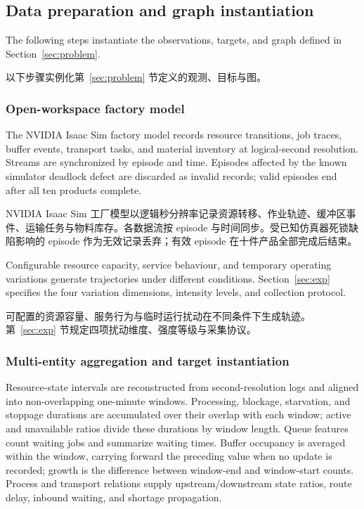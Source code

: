 \documentclass[a4paper,fleqn]{cas-dc}
\newcommand{\zhpara}[1]{%
  \par\begingroup\small\color{black!72}\noindent #1\par\endgroup}
\begin{document}
\subsection{Data preparation and graph instantiation}

The following steps instantiate the observations, targets, and graph defined in Section~\ref{sec:problem}.

\zhpara{以下步骤实例化第~\ref{sec:problem} 节定义的观测、目标与图。}


\subsubsection{Open-workspace factory model}

The NVIDIA Isaac Sim factory model records resource transitions, job traces, buffer events, transport tasks, and material inventory at logical-second resolution. Streams are synchronized by episode and time. Episodes affected by the known simulator deadlock defect are discarded as invalid records; valid episodes end after all ten products complete.

\zhpara{NVIDIA Isaac Sim 工厂模型以逻辑秒分辨率记录资源转移、作业轨迹、缓冲区事件、运输任务与物料库存。各数据流按 episode 与时间同步。受已知仿真器死锁缺陷影响的 episode 作为无效记录丢弃；有效 episode 在十件产品全部完成后结束。}


Configurable resource capacity, service behaviour, and temporary operating variations generate trajectories under different conditions. Section~\ref{sec:exp} specifies the four variation dimensions, intensity levels, and collection protocol.

\zhpara{可配置的资源容量、服务行为与临时运行扰动在不同条件下生成轨迹。第~\ref{sec:exp} 节规定四项扰动维度、强度等级与采集协议。}


\subsubsection{Multi-entity aggregation and target instantiation}

Resource-state intervals are reconstructed from second-resolution logs and aligned into non-overlapping one-minute windows. Processing, blockage, starvation, and stoppage durations are accumulated over their overlap with each window; active and unavailable ratios divide these durations by window length. Queue features count waiting jobs and summarize waiting times. Buffer occupancy is averaged within the window, carrying forward the preceding value when no update is recorded; growth is the difference between window-end and window-start counts. Process and transport relations supply upstream/downstream state ratios, route delay, inbound waiting, and shortage propagation.
\end{document}
